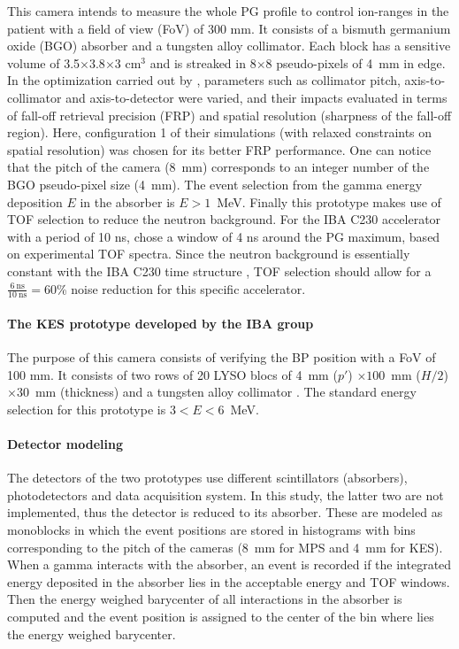 \documentclass[a4paper,english,12pt]{article}
\begin{document}
This camera intends to measure the whole PG profile to control ion-ranges in the patient with a field of view (FoV) of 300 mm. It consists of a bismuth germanium oxide (BGO) absorber and a tungsten alloy collimator. Each block has a sensitive volume of 3.5$\times$3.8$\times$3 cm$^{3}$ and is streaked in 8$\times$8 pseudo-pixels of 4~mm in edge. In the optimization carried out by \cite{Pinto2014a}, parameters such as collimator pitch, axis-to-collimator and axis-to-detector were varied, and their impacts evaluated in terms of fall-off retrieval precision (FRP) and spatial resolution (sharpness of the fall-off region). Here, configuration 1 of their simulations (with relaxed constraints on spatial resolution) was chosen for its better FRP performance. One can notice that the pitch of the camera (8~mm) corresponds to an integer number of the BGO pseudo-pixel size (4~mm). The event selection from the gamma energy deposition $E$ in the absorber is $E>1$~MeV. Finally this prototype makes use of TOF selection to reduce the neutron background. For the IBA C230 accelerator with a period of 10 ns, \cite{Pinto2014a} chose a window of 4 ns around the PG maximum, based on experimental TOF spectra. Since the neutron background is essentially constant with the IBA C230 time structure \citep{Pinto2014a}, TOF selection should allow for a $\frac{6~\text{ns}}{10~\text{ns}}=60$\% noise reduction for this specific accelerator.

\paragraph{The KES prototype developed by the IBA group}

The purpose of this camera consists of verifying the BP position with a FoV of 100 mm. It consists of two rows of 20 LYSO blocs of 4~mm ($p'$) $\times 100$~mm ($H/2$) $\times30$~mm (thickness) and a tungsten alloy collimator \citep{Perali2014,Sterpin2015}. The standard energy selection for this prototype is $3<E<6$~MeV.

\paragraph{Detector modeling}

The detectors of the two prototypes use different scintillators (absorbers), photodetectors and data acquisition system. In this study, the latter two are not implemented, thus the detector is reduced to its absorber. These are modeled as monoblocks in which the event positions are stored in histograms with bins corresponding to the pitch of the cameras (8~mm for MPS and 4~mm for KES). When a gamma interacts with the absorber, an event is recorded if the integrated energy deposited in the absorber lies in the acceptable energy and TOF windows. Then the energy weighed barycenter of all interactions in the absorber is computed and the event position is assigned to the center of the bin where lies the energy weighed barycenter.
\end{document}
